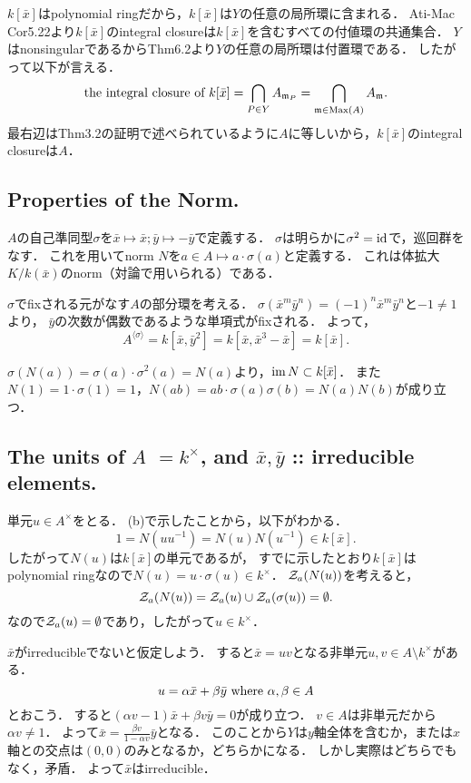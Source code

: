 \documentclass[a4paper]{jsarticle}
\begin{document}
    $k[\bar{x}]$はpolynomial ringだから，$k[\bar{x}]$は$Y$の任意の局所環に含まれる．
    Ati-Mac Cor5.22より$k[\bar{x}]$のintegral closureは$k[\bar{x}]$を含むすべての付値環の共通集合．
    $Y$はnonsingularであるからThm6.2より$Y$の任意の局所環は付置環である．
    したがって以下が言える．
    \[ \text{the integral closure of }k[\bar{x}] = \bigcap_{P \in Y} A_{\mathfrak{m}_P}=\bigcap_{\mathfrak{m} \in \operatorname{Max}(A)} A_{\mathfrak{m}}. \]
    最右辺はThm3.2の証明で述べられているように$A$に等しいから，$k[\bar{x}]$のintegral closureは$A$．

    \subsection{Properties of the Norm.}
    $A$の自己準同型$\sigma$を$\bar{x} \mapsto \bar{x}; \bar{y} \mapsto -\bar{y}$で定義する．
    $\sigma$は明らかに$\sigma^2=\mathrm{id}_{}$で，巡回群をなす．
    これを用いてnorm $N$を$a \in A \mapsto a \cdot \sigma(a)$と定義する．
    これは体拡大$K/k(\bar{x})$のnorm（対論で用いられる）である．

    $\sigma$でfixされる元がなす$A$の部分環を考える．
    $\sigma(\bar{x}^m \bar{y}^n)=(-1)^n \bar{x}^m \bar{y}^n$と$-1 \neq 1$より，
    $\bar{y}$の次数が偶数であるような単項式がfixされる．
    よって，
    \[ A^{\langle \sigma \rangle}=k[\bar{x}, \bar{y}^2]=k[\bar{x}, \bar{x}^3-\bar{x}]=k[\bar{x}]. \]

    $\sigma(N(a))=\sigma(a) \cdot \sigma^2(a)=N(a)$より，$\operatorname{im} N \subset k[\bar{x}]$．
    また$N(1)=1 \cdot \sigma(1)=1$，$N(ab)=ab \cdot \sigma(a) \sigma(b)=N(a)N(b)$が成り立つ．

    \subsection{The units of $A$ $=k^{\times}$, and $\bar{x}, \bar{y}$ :: irreducible elements.}
    単元$u \in A^{\times}$をとる．
    (b)で示したことから，以下がわかる．
    \[ 1=N(u u^{-1})=N(u) N(u^{-1}) \in k[\bar{x}]. \]
    したがって$N(u)$は$k[\bar{x}]$の単元であるが，
    すでに示したとおり$k[\bar{x}]$はpolynomial ringなので$N(u)=u \cdot \sigma(u) \in k^{\times}$．
    $\mathcal{Z}_a(N(u))$を考えると，
    \[ \mathcal{Z}_a(N(u))=\mathcal{Z}_a(u) \cup \mathcal{Z}_a(\sigma(u))=\emptyset. \]
    なので$\mathcal{Z}_a(u)=\emptyset$であり，したがって$u \in k^{\times}$．

    $\bar{x}$がirreducibleでないと仮定しよう．
    すると$\bar{x}=u v$となる非単元$u,v \in A \setminus k^{\times}$がある．
    \[ u=\alpha \bar{x}+\beta \bar{y} \text{ where } \alpha,\beta \in A \]
    とおこう．
    すると$(\alpha v-1) \bar{x}+\beta v \bar{y}=0$が成り立つ．
    $v \in A$は非単元だから$\alpha v \neq 1$．
    よって$\bar{x}=\frac{\beta v}{1- \alpha v} \bar{y}$となる．
    このことから$Y$は$y$軸全体を含むか，または$x$軸との交点は$(0,0)$のみとなるか，どちらかになる．
    しかし実際はどちらでもなく，矛盾．
    よって$\bar{x}$はirreducible．
\end{document}
